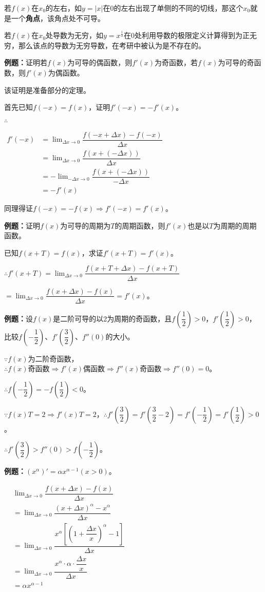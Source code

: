 \documentclass[UTF8, 12pt]{ctexart}
\begin{document}
若$f(x)$在$x_0$的左右，如$y=\vert x\vert$在$0$的左右出现了单侧的不同的切线，那这个$x_0$就是一个\textbf{角点}，该角点处不可导。

若$f(x)$在$x_0$处导数为无穷，如$y=x^{\frac{1}{3}}$在$0$处利用导数的极限定义计算得到为正无穷，那么该点的导数为无穷导数，在考研中被认为是不存在的。

\textbf{例题：}证明若$f(x)$为可导的偶函数，则$f'(x)$为奇函数，若$f(x)$为可导的奇函数，则$f'(x)$为偶函数。

该证明是准备部分的定理。

首先已知$f(-x)=f(x)$，证明$f'(-x)=-f'(x)$。

$\therefore$

$
\begin{aligned}
    f'(-x) &=\lim_{\Delta x\to 0}\dfrac{f(-x+\Delta x)-f(-x)}{\Delta x} \\
    & =\lim_{\Delta x\to 0}\dfrac{f(x+(-\Delta x))}{\Delta x} \\
    & =-\lim_{-\Delta x\to 0}\dfrac{f(x+(-\Delta x))}{-\Delta x} \\
    & =-f'(x)
\end{aligned}
$

同理得证$f(-x)=-f(x)\Rightarrow f'(-x)=f'(x)$。

\textbf{例题：}证明$f(x)$为可导的周期为$T$的周期函数，则$f'(x)$也是以$T$为周期的周期函数。

已知$f(x+T)=f(x)$，求证$f'(x+T)=f'(x)$。

$\therefore f'(x+T)=\lim_{\Delta x\to 0}\dfrac{f(x+T+\Delta x)-f(x+T)}{\Delta x}$

$=\lim_{\Delta x\to 0}\dfrac{f(x+\Delta x)-f(x)}{\Delta x}=f'(x)$。

\textbf{例题：}设$f(x)$是二阶可导的以2为周期的奇函数，且$f(\dfrac{1}{2})>0$，$f'(\dfrac{1}{2})>0$，比较$f(-\dfrac{1}{2})$、$f'(\dfrac{3}{2})$、$f''(0)$的大小。

$\because f(x)$为二阶奇函数，$\therefore f(x)\text{奇函数}\Rightarrow f'(x)\text{偶函数}\Rightarrow f''(x)\text{奇函数}\Rightarrow f''(0)=0$。

$\therefore f(-\dfrac{1}{2})=-f(\dfrac{1}{2})<0$。

$\because f(x)T=2\Rightarrow f'(x)T=2$，$\therefore f'(\dfrac{3}{2})=f'(\dfrac{3}{2}-2)=f'(-\dfrac{1}{2})=f'(\dfrac{1}{2})>0$。

$\therefore f'(\dfrac{3}{2})>f''(0)>f(-\dfrac{1}{2})$。

\textbf{例题：}$\left(x^\alpha\right)'=\alpha x^{\alpha-1}(x>0)$。

$
\begin{aligned}
    & \lim_{\Delta x\to 0}\dfrac{f(x+\Delta x)-f(x)}{\Delta x} \\
    & =\lim_{\Delta x\to 0}\dfrac{\left(x+\Delta x\right)^\alpha-x^\alpha}{\Delta x} \\
    & =\lim_{\Delta x\to 0}\dfrac{x^\alpha\left[\left(1+\dfrac{\Delta x}{x}\right)^\alpha-1\right]}{\Delta x} \\
    & =\lim_{\Delta x\to 0}\dfrac{x^\alpha\cdot\alpha\cdot\dfrac{\Delta x}{x}}{\Delta x} \\
    & =\alpha x^{\alpha-1}
\end{aligned}
$
\end{document}

